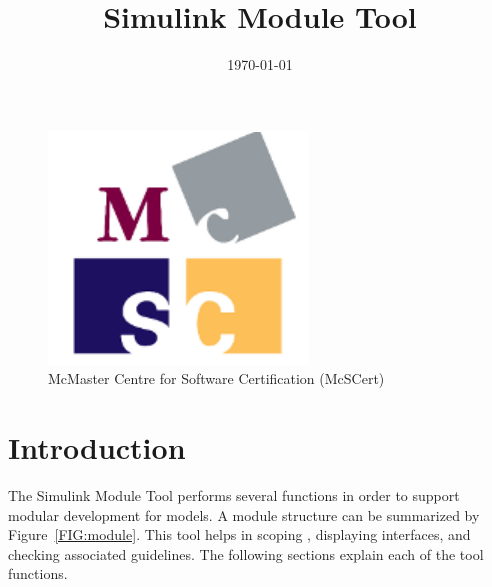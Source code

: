 \documentclass{article}
\makeatletter
\newcommand{\ToolName}{Simulink Module Tool\@\xspace}
\makeatother
\begin{document}
\title{\ToolName}
\date{\monthyeardate\today}
\maketitle
\vfill

\begin{figure}
	\centering
	\includegraphics{../figs/McSCert_Logo.pdf} \\
	McMaster Centre for Software Certification (McSCert)
\end{figure}

\newpage

\tableofcontents
\newpage

\section{Introduction}

The \ToolName performs several functions in order to support modular development for \Simulink models. A \Simulink module structure can be summarized by Figure~\ref{FIG:module}. This tool helps in scoping , displaying interfaces, and checking associated guidelines. The following sections explain each of the tool functions.
\end{document}
